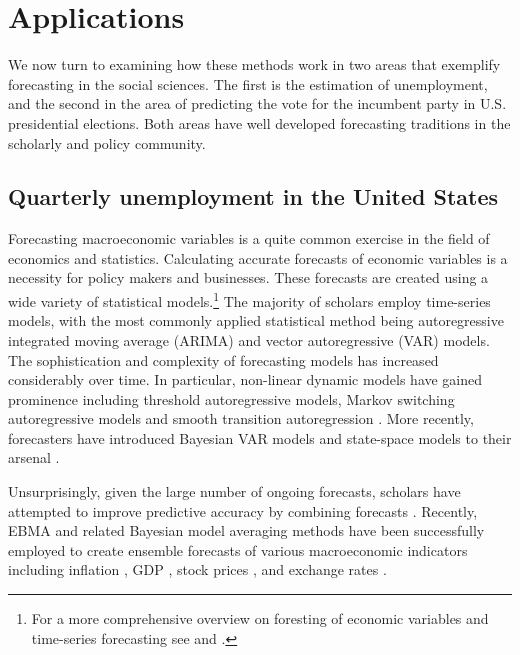 \documentclass[12pt,fullpage,endnotes]{article}
\begin{document}
\section{Applications}
\label{empirics}


We now turn to examining how these methods work in two areas that
exemplify forecasting in the social sciences. The first  is the estimation of  unemployment, 
and the second in the area of predicting the vote for the incumbent party in U.S. presidential
elections. Both areas have well developed forecasting traditions in the scholarly and policy community.


\subsection{Quarterly unemployment in the United States}
\label{econ}

Forecasting macroeconomic variables is a quite common exercise in the
field of economics and statistics. Calculating accurate forecasts of
economic variables is a necessity for policy makers and
businesses. These forecasts are created using a wide variety of
statistical models.\footnote{For a more comprehensive overview on
  foresting of economic variables and time-series forecasting see
  \citet{Elliott:Timmermann:2008} and \citet{Goijer:Hyndman:2006}.}
The majority of scholars employ time-series models, with the most
commonly applied statistical method being autoregressive integrated
moving average (ARIMA) and vector autoregressive (VAR) models. The
sophistication and complexity of forecasting models has increased
considerably over time. In particular, non-linear dynamic models have
gained prominence including threshold autoregressive models, Markov
switching autoregressive models and smooth transition autoregression
\citep{Elliott:Timmermann:2008,Montgomery:etal:1998}. More recently,
forecasters have introduced Bayesian VAR models and state-space models
to their arsenal \citep{Goijer:Hyndman:2006,Elliott:Timmermann:2008}.

Unsurprisingly, given the large number of ongoing forecasts, scholars
have attempted to improve predictive accuracy by combining forecasts
\citep{Bates:1969, Palm:Zellner:1992, Elliott:Timmermann:2008}.
Recently, EBMA and related Bayesian model averaging methods have been
successfully employed to create ensemble forecasts of various
macroeconomic indicators including inflation
\citep{Koop:2010,Wright:2009}, GDP \citep{Billio:2010}, stock prices
\citep{Billio:2011}, and exchange rates \citep{Wright:2008}.
\end{document}
